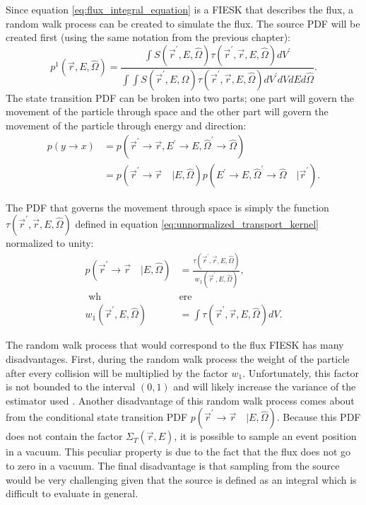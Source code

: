 Since equation \ref{eq:flux_integral_equation} is a FIESK that describes the
flux, a random walk process can be created to simulate the flux. The source PDF 
will be created first (using the same notation from the previous chapter):
\begin{equation}
  p^1(\vec{r},E,\hat{\Omega}) = \frac{\int S(\vec{r}^{'},E,\hat{\Omega})
    \tau(\vec{r}^{'},\vec{r},E,\hat{\Omega}) dV^{'}}{\int\int S(\vec{r}^{'},E,\hat{\Omega})
    \tau(\vec{r}^{'},\vec{r},E,\hat{\Omega}) dV^{'} dV dE d\hat{\Omega}}.
\end{equation}
The state transition PDF can be broken into two parts; one part will govern the
movement of the particle through space and the other part will govern the 
movement of the particle through energy and direction: 
\begin{align}
  p(y \to x) & =
  p(\vec{r}^{'} \to \vec{r}, E^{'} \to E, \hat{\Omega}^{'} \to \hat{\Omega})
  \nonumber \\
  & = p(\vec{r}^{'} \to \vec{r}\quad| E,\hat{\Omega})
  p(E^{'} \to E, \hat{\Omega}^{'} \to \hat{\Omega}\quad|\vec{r}^{'}).
\end{align} 

The PDF that governs the movement through space is simply the function 
$\tau(\vec{r}^{'},\vec{r},E,\hat{\Omega})$ defined in equation 
\ref{eq:unnormalized_transport_kernel} normalized to unity: 
\begin{align}
  p(\vec{r}^{'} \to \vec{r} \quad | E,\hat{\Omega}) & =
  \frac{\tau(\vec{r}^{'},\vec{r},E,\hat{\Omega})}
       {w_1(\vec{r}^{'},E,\hat{\Omega})},  \\
  \text{ wh}&\text{ere} \nonumber \\
  w_1(\vec{r}^{'},E,\hat{\Omega}) & = \int \tau(\vec{r}^{'},\vec{r},E,\hat{\Omega}) dV.
\end{align}

The random walk process that would correspond to the flux FIESK has many
disadvantages. First, during the random walk process the weight of the 
particle after every collision will be multiplied by the factor $w_1$. 
Unfortunately, this factor is not bounded to the interval $(0,1)$ and will 
likely increase the variance of the estimator used \citep{spanier_monte_1969}. 
Another disadvantage of this random walk process comes about from the 
conditional state transition PDF 
$p(\vec{r}^{'} \to \vec{r}\quad| E,\hat{\Omega})$. Because this PDF does not 
contain the factor $\Sigma_T(\vec{r},E)$, it is possible to sample an event 
position in a vacuum. This peculiar property is due to the fact that the flux 
does not go to zero in a vacuum. The final disadvantage is that sampling from
the source would be very challenging given that the source is defined as
an integral which is difficult to evaluate in general.


